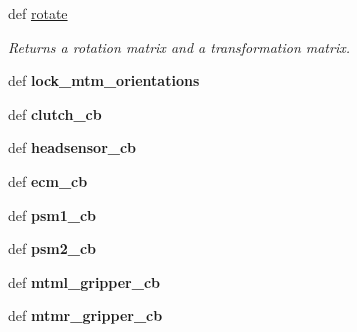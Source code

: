 \begin{DoxyCompactItemize}
\item 
def \hyperlink{classcamera__control__node_1_1Teleop__class_aa78815b8b1658cbcfb27884dbc7a18c9}{rotate}
\begin{DoxyCompactList}\small\item\em Returns a rotation matrix and a transformation matrix. \end{DoxyCompactList}\item 
\hypertarget{classcamera__control__node_1_1Teleop__class_a6ce4ac6cf0fa31b92c3bbb2243f872ea}{def {\bfseries lock\-\_\-mtm\-\_\-orientations}}\label{classcamera__control__node_1_1Teleop__class_a6ce4ac6cf0fa31b92c3bbb2243f872ea}

\item 
\hypertarget{classcamera__control__node_1_1Teleop__class_aa983cfd6600f941fe7c47c8c5cfd6244}{def {\bfseries clutch\-\_\-cb}}\label{classcamera__control__node_1_1Teleop__class_aa983cfd6600f941fe7c47c8c5cfd6244}

\item 
\hypertarget{classcamera__control__node_1_1Teleop__class_a9721e3eceb6523864770e225c6a69707}{def {\bfseries headsensor\-\_\-cb}}\label{classcamera__control__node_1_1Teleop__class_a9721e3eceb6523864770e225c6a69707}

\item 
\hypertarget{classcamera__control__node_1_1Teleop__class_ae3af0e2664ef1d385410f036ca71b1ba}{def {\bfseries ecm\-\_\-cb}}\label{classcamera__control__node_1_1Teleop__class_ae3af0e2664ef1d385410f036ca71b1ba}

\item 
\hypertarget{classcamera__control__node_1_1Teleop__class_a6c51b08061e26b052a2a0ddf1b2c66a4}{def {\bfseries psm1\-\_\-cb}}\label{classcamera__control__node_1_1Teleop__class_a6c51b08061e26b052a2a0ddf1b2c66a4}

\item 
\hypertarget{classcamera__control__node_1_1Teleop__class_a84ac7d696559c59b18fa1916596e2b0d}{def {\bfseries psm2\-\_\-cb}}\label{classcamera__control__node_1_1Teleop__class_a84ac7d696559c59b18fa1916596e2b0d}

\item 
\hypertarget{classcamera__control__node_1_1Teleop__class_a7ba4b77a7a7f41453545ca5f789485cf}{def {\bfseries mtml\-\_\-gripper\-\_\-cb}}\label{classcamera__control__node_1_1Teleop__class_a7ba4b77a7a7f41453545ca5f789485cf}

\item 
\hypertarget{classcamera__control__node_1_1Teleop__class_ade480a9dbf35c2d89f4745198d8ba938}{def {\bfseries mtmr\-\_\-gripper\-\_\-cb}}\label{classcamera__control__node_1_1Teleop__class_ade480a9dbf35c2d89f4745198d8ba938}


\end{DoxyCompactItemize}
